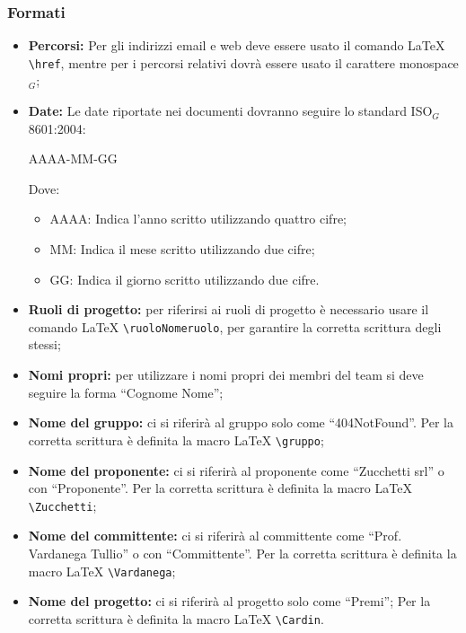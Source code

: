 \subsubsection{Formati}
\begin{itemize}
\item \textbf{Percorsi:} Per gli indirizzi email e web deve essere usato il comando \LaTeX{} \verb|\href|, mentre per i percorsi relativi dovrà essere usato il carattere monospace$_{G}$;
\item \textbf{Date:} Le date riportate nei documenti dovranno seguire lo standard ISO$_G$ 8601:2004:
\begin{center}
AAAA-MM-GG
\end{center}
Dove:
\begin{itemize}
\item AAAA: Indica l'anno scritto utilizzando quattro cifre;
\item MM: Indica il mese scritto utilizzando due cifre;
\item GG: Indica il giorno scritto utilizzando due cifre.
\end{itemize}
\item \textbf{Ruoli di progetto:} per riferirsi ai ruoli di progetto è necessario usare il comando \LaTeX{} \verb|\ruoloNomeruolo|, per garantire la corretta scrittura degli stessi;
\item \textbf{Nomi propri:} per utilizzare i nomi propri dei membri del team si deve seguire la forma ``Cognome Nome'';
\item \textbf{Nome del gruppo:} ci si riferirà al gruppo solo come ``404NotFound''. Per la corretta scrittura è definita la macro \LaTeX{} \verb|\gruppo|;
\item \textbf{Nome del proponente:} ci si riferirà al proponente come ``Zucchetti srl'' o con ``Proponente''. Per la corretta scrittura è definita la macro \LaTeX{} \verb|\Zucchetti|;
\item \textbf{Nome del committente:} ci si riferirà al committente come ``Prof. Vardanega Tullio'' o con ``Committente''. Per la corretta scrittura è definita la macro \LaTeX{} \verb|\Vardanega|;
\item \textbf{Nome del progetto:} ci si riferirà al progetto solo come ``Premi''; Per la corretta scrittura è definita la macro \LaTeX{} \verb|\Cardin|.
\end{itemize}

